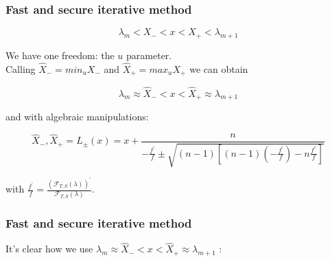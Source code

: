 \documentclass{beamer}
\newcommand{\effe}[2]{\mathcal{F}_{#1}(#2)}
\theoremstyle{definition} \newtheorem{de}{Def}
\theoremstyle{remark} \newtheorem{os}[de]{Oss}
\theoremstyle{plain} \newtheorem{te}[de]{Teo}
\theoremstyle{plain} \newtheorem{co}[de]{Cor}
\theoremstyle{plain} \newtheorem{pr}[de]{Prop}
\theoremstyle{plain} \newtheorem{lem}[de]{Lemm}
\theoremstyle{remark} \newtheorem{rem}[de]{Remark}
\begin{document}
\begin{frame}
\frametitle{Fast and secure iterative method}

\begin{equation*}
  \lambda_m < X_{-} < x < X_{+} < \lambda_{m+1}
\end{equation*}

We have one freedom: the $u$ parameter. \\
Calling $\hat X_{-}=min_{u} X_{-}$ and $\hat X_{+}=max_{u} X_{+}$  we can obtain


\begin{equation*}
  \lambda_m \approx \hat X_{-} < x < \hat X_{+} \approx \lambda_{m+1}
\end{equation*}

and with algebraic manipulations: 

\begin{equation*}
  \hat X_{-}, \hat X_{+} = L_{\pm}(x) = x + \frac{ n }{ -\frac{f^{'}}{f} \pm \sqrt{(n-1)[ (n-1)(-\frac{f^{'}}{f}) -n\frac{f^{''}}{f} ]} }
\end{equation*}

with $\frac{f^{'}}{f}=\frac{ (\effe{T,S}{\lambda})^{'} }{ \effe{T,S}{\lambda} }$.

\end{frame}


\begin{frame}
\frametitle{Fast and secure iterative method}

It's clear how we use $\lambda_m \approx \hat X_{-} < x < \hat X_{+} \approx \lambda_{m+1}$ :


\end{frame}
\end{document}
